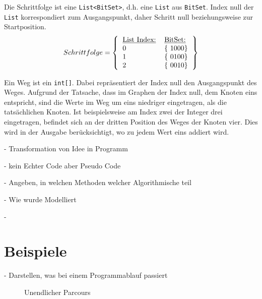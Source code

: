\documentclass[a4paper,10pt,ngerman]{scrartcl}
\begin{document}
    Die Schrittfolge ist eine \texttt{List<BitSet>},
    d.h. eine \texttt{List} aus \texttt{BitSet}.
    Index null der \texttt{List} korrespondiert zum Ausgangspunkt,
    daher Schritt null beziehungsweise zur Startposition.
    \[
        Schrittfolge = \left\lbrace
        \begin{tabular}{ll}
            \underline{\text{List Index:}} & \underline{\text{BitSet:}} \\
            0                              & \{  1000\}                   \\
            1                              & \{  0100\}                   \\
            2                              & \{  0010\}                   \\
        \end{tabular}
        \right\rbrace
    \]

    Ein Weg ist ein \texttt{int[]}.
    Dabei repräsentiert der Index null den Ausgangspunkt des Weges.
    Aufgrund der Tatsache, dass im Graphen der Index null, dem Knoten eins entspricht,
    sind die Werte im Weg um eins niedriger eingetragen, als die tatsächlichen Knoten.
    Ist beispielsweise am Index zwei der Integer drei eingetragen,
    befindet sich an der dritten Position des Weges der Knoten vier.
    Dies wird in der Ausgabe berücksichtigt, wo zu jedem Wert eins addiert wird.

    - Transformation von Idee in Programm

    - kein Echter Code aber Pseudo Code

    - Angeben, in welchen Methoden welcher Algorithmische teil

    - Wie wurde Modelliert

    -


    \section{Beispiele}\label{sec:beispiele}

    - Darstellen, was bei einem Programmablauf passiert

    \begin{figure}[h!]
        \centering
        \FigurVier{}
        \caption{Unendlicher Parcours}
        \label{fig:Figure4}
    \end{figure}
\end{document}
